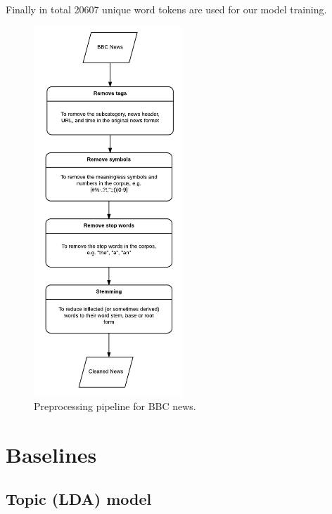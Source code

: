 Finally in total 20607 unique word tokens are used for our model training.
\begin{figure}[h]
\centering
\includegraphics[width=0.5\textwidth]{figures/pipeline.png}
\caption{Preprocessing pipeline for BBC news.}
\label{fig:pipeline}
\end{figure}
\section{Baselines}
\subsection{Topic (LDA) model}

